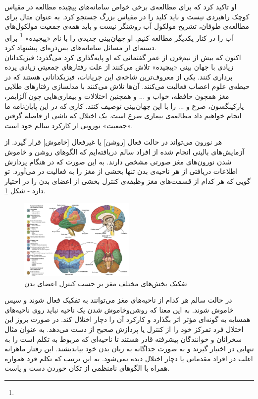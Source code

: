 او تاکید کرد که برای مطالعه‌ی برخی خواص سامانه‌های پیچیده مطالعه در مقیاس کوچک راهبردی نیست و باید کلید را در مقیاس بزرگ جستجو کرد. به عنوان مثال برای مطالعه‌ی طوفان، تشریح مولکول آب روشنگر نیست و باید همه‌ی جمعیت مولکول‌های آب را در کنار یکدیگر مطالعه کنیم. او  جهان‌بینی جدیدی را با نام «پیچیده»
\footnote{
}
 برای دسته‌ای از مسائل سامانه‌های بس‌ذره‌ای پیشنهاد کرد.\\
 
 اکنون که بیش از نیم‌قرن از عمر گفتمانی که او پایه‌گذاری کرد می‌گذرد؛ فیزیکدانان زیادی با جهان بینی «پیچیده» تلاش می‌کنند از علت رفتارهای جمعیتی زیادی پرده برداری کنند. یکی از معروف‌ترین شاخه‌ی این جریانات، فیزیکدانانی هستند که در حیطه‌ی علوم اعصاب فعالیت می‌کنند. آن‌ها تلاش می‌کنند با مدلسازی رفتارهای طلایی مغز همچون حافظه، خواب و ... و همچنین اختلالات و بیماری‌هایی چون آلزایمر، پارکینگسون، صرع و ... را با این جهان‌بینی توصیف کنند. کاری که در این پایان‌نامه ما انجام خواهیم داد مطالعه‌ی بیماری صرع است. یک اختلال که ناشی از فاصله گرفتن «جمعیت» نورونی از کارکرد سالم خود است.

 هر نورون‌ می‌تواند در حالت فعال [روشن] یا غیرفعال [خاموش] قرار گیرد. از آزمایش‌های بالینی انجام شده از افراد سالم دریافته‌ایم که الگوهای روشن و خاموش شدن نورون‌های مغز صورتی مشخص دارند. به این صورت که در هنگام پردازش اطلاعات دریافتی از هر ناحیه‌ی بدن تنها بخشی از مغز را به فعالیت در می‌آورد. تو گویی که هر کدام از قسمت‌های مغز وظیفه‌ی کنترل بخشی از اعضای بدن را در اختیار دارد - شکل \ref{fig:brain_anatomy}. 

\begin{figure}
	\centering
	\includegraphics[width=0.5\textwidth]{../Figures/neuroanatomy_plot.jpg}
	\caption{
		تفکیک بخش‌های مختلف مغز بر حسب کنترل اعضای بدن
		\cite{penttila_2022}
	}
	\label{fig:brain_anatomy}
\end{figure}

 در حالت سالم هر کدام از ناحیه‌های مغز می‌توانند به تفکیک فعال شوند و سپس خاموش شوند. به این معنا که روشن‌وخاموش شدن یک ناحیه نباید روی ناحیه‌های همسایه به گونه‌ای مؤثر اثر بگذارد و کارکرد آن را دچار اختلال کند. در صورت بروز این اختلال فرد تمرکز خود را از کنترل یا پردازش صحیح از دست می‌دهد. به عنوان مثال سخرانان و خوانندگان پیشرفته قادر هستند تا ناحیه‌ای که مربوط به تکلم است را به تنهایی در اختیار گیرند و به صورت جداگانه به زبان بدن خود بیاندیشند. این رفتار ماهرانه اغلب در افراد مقدماتی یا دچار اختلال دیده نمی‌شود. به این ترتیب که تکلم فرد همواره همراه با الگوهای نامنظمی از تکان خوردن دست و پاست.\\
 
